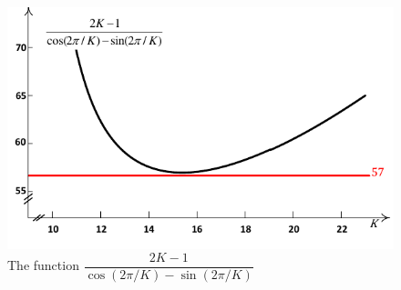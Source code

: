 \documentclass[review]{elsarticle}
\begin{document}
\begin{figure}[h]
  \centering
  \includegraphics[scale=.7]{Figs/fig3.pdf}
  \vspace{-10pt}
  \caption{The function $\dfrac{2K-1}{\cos(2\pi/K)-\sin(2\pi/K)}$ }
  \label{fig:function}
\end{figure}
\end{document}

